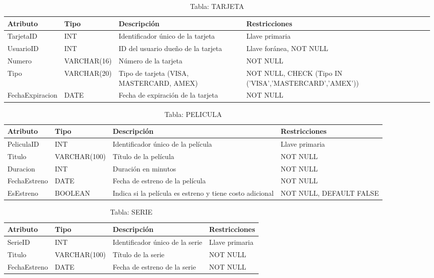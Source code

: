 \documentclass[12pt, a4paper]{article}
\begin{document}
\begin{table}[ht]
\centering
\caption{Tabla: TARJETA}
\begin{tabular}{|l|l|p{4.5cm}|p{3.5cm}|}
\hline
\textbf{Atributo} & \textbf{Tipo} & \textbf{Descripción} &
\textbf{Restricciones} \\
\hline
TarjetaID & INT & Identificador único de la tarjeta & Llave primaria \\
\hline
UsuarioID & INT & ID del usuario dueño de la tarjeta & Llave foránea, NOT NULL
\\
\hline
Numero & VARCHAR(16) & Número de la tarjeta & NOT NULL \\
\hline
Tipo & VARCHAR(20) & Tipo de tarjeta (VISA, MASTERCARD, AMEX) & NOT NULL, CHECK
(Tipo IN ('VISA','MASTERCARD','AMEX')) \\
\hline
FechaExpiracion & DATE & Fecha de expiración de la tarjeta & NOT NULL \\
\hline
\end{tabular}
\end{table}
\newpage

\begin{table}[ht]
\centering
\caption{Tabla: PELICULA}
\begin{tabular}{|l|l|p{4.5cm}|p{3.5cm}|}
\hline
\textbf{Atributo} & \textbf{Tipo} & \textbf{Descripción} &
\textbf{Restricciones} \\
\hline
PeliculaID & INT & Identificador único de la película & Llave primaria \\
\hline
Titulo & VARCHAR(100) & Título de la película & NOT NULL \\
\hline
Duracion & INT & Duración en minutos & NOT NULL \\
\hline
FechaEstreno & DATE & Fecha de estreno de la película & NOT NULL \\
\hline
EsEstreno & BOOLEAN & Indica si la película es estreno y tiene costo adicional &
NOT NULL, DEFAULT FALSE \\
\hline
\end{tabular}
\end{table}
\newpage

\begin{table}[ht]
\centering
\caption{Tabla: SERIE}
\begin{tabular}{|l|l|p{4.5cm}|p{3.5cm}|}
\hline
\textbf{Atributo} & \textbf{Tipo} & \textbf{Descripción} &
\textbf{Restricciones} \\
\hline
SerieID & INT & Identificador único de la serie & Llave primaria \\
\hline
Titulo & VARCHAR(100) & Título de la serie & NOT NULL \\
\hline
FechaEstreno & DATE & Fecha de estreno de la serie & NOT NULL \\
\hline
\end{tabular}
\end{table}
\newpage
\end{document}
